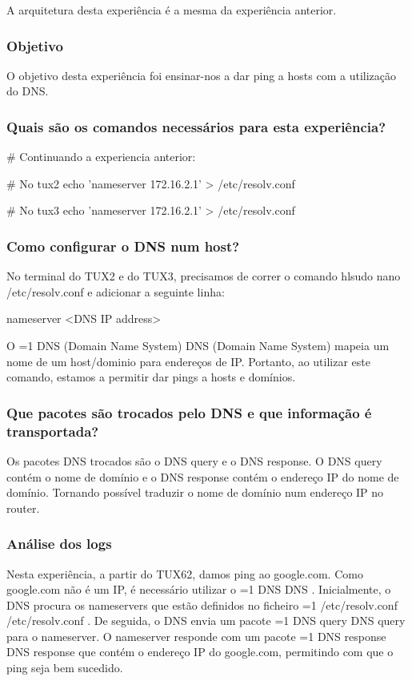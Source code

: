 \documentclass[11pt,a4paper,twocolumn]{article}
\newcommand{\hl}[2][1]{%
  \ifnum#1=1\relax
    \textcolor{text-hl1}{#2}%
  \else
    \textcolor{text-hl2}{#2}%
  \fi
}
\begin{document}
A arquitetura desta experiência é a mesma da experiência anterior.

\subsubsection{Objetivo}

O objetivo desta experiência foi ensinar-nos a dar ping a hosts com a utilização do DNS.

\subsubsection{Quais são os comandos necessários para esta experiência?}

\begin{bash-darktheme}
    # Continuando a experiencia anterior:

    # No tux2
    echo 'nameserver 172.16.2.1' > /etc/resolv.conf
    
    # No tux3
    echo 'nameserver 172.16.2.1' > /etc/resolv.conf

\end{bash-darktheme}

\subsubsection{ Como configurar o DNS num host?}

No terminal do TUX2 e do TUX3, precisamos de correr o comando hl{sudo nano /etc/resolv.conf} e adicionar a seguinte linha:

\begin{bash-darktheme}
    nameserver <DNS IP address>
\end{bash-darktheme}

O \hl{DNS (Domain Name System)} mapeia um nome de um host/dominio para endereços de IP. Portanto, ao utilizar este comando, estamos a permitir dar pings a hosts e domínios.

\subsubsection{ Que pacotes são trocados pelo DNS e que informação é transportada?}

Os pacotes DNS  trocados são o DNS query e o DNS response. O DNS query contém o nome de domínio e o DNS response contém o endereço IP do nome de domínio. Tornando possível traduzir o nome de domínio num endereço IP no router.

\subsubsection{Análise dos logs}

Nesta experiência, a partir do TUX62, damos ping ao google.com. Como google.com não é um IP, é necessário utilizar o \hl{DNS}. 
Inicialmente, o DNS procura os nameservers que estão definidos no ficheiro \hl{/etc/resolv.conf}. De seguida, o DNS envia um pacote \hl{DNS query} para o nameserver. O nameserver responde com um pacote \hl{DNS response} que contém o endereço IP do google.com, permitindo com que o ping seja bem sucedido.
\end{document}
